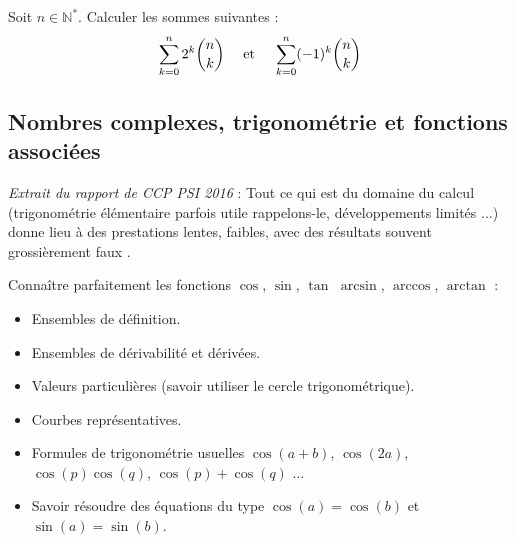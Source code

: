 \documentclass[a4paper,twoside,french,11pt]{VcCours}
\begin{document}
%

\begin{Exercice}{}
  Soit $n \in \mathbb{N}^*$. Calculer les sommes suivantes : 
  $$ \sum_{k=0}^n 2^k \binom{n}{k} \quad \hbox{ et } \quad \sum_{k=0}^n (-1)^k \binom{n}{k}$$
\end{Exercice} 

\subsection{Nombres complexes, trigonométrie et fonctions associées}

\textit{Extrait du rapport de CCP PSI 2016} : \og Tout ce qui est du domaine du calcul (trigonométrie élémentaire parfois utile rappelons-le, développements limités ...) donne lieu à des prestations lentes, faibles, avec des résultats souvent grossièrement faux \fg .

\begin{ptc}{}
	Connaître parfaitement les fonctions $\cos$, $\sin$, $\tan$ $\arcsin$, $\arccos$, $\arctan$ :
\begin{itemize}
\item Ensembles de définition.
\item Ensembles de dérivabilité et dérivées. 
\item Valeurs particulières (savoir utiliser le cercle trigonométrique).
\item Courbes représentatives.
\item Formules de trigonométrie usuelles $\cos(a+b)$, $\cos(2a)$, $\cos(p)\cos(q)$, $\cos(p)+\cos(q)$ $\ldots$
\item Savoir résoudre des équations du type $\cos(a)= \cos(b)$ et $\sin(a)=\sin(b)$.
\end{itemize}
\end{ptc}
%
\end{document}
